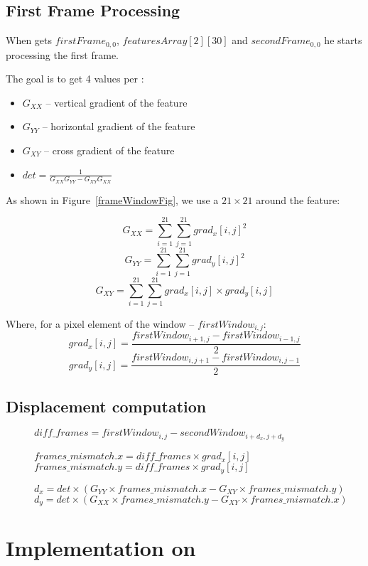 \subsection{First Frame Processing}

When \vc{} gets $firstFrame_{0,0}$,  $featuresArray[2][30]$ and $secondFrame_{0,0}$ he starts processing the first frame.

The goal is to get 4 values per :
\begin{itemize}
	\item $G_{XX}$ -- vertical gradient of the feature
	\item $G_{YY}$ -- horizontal gradient of the feature
	\item $G_{XY}$ -- cross gradient of the feature
	\item $det = \frac{1}{G_{XX}G_{YY}-G_{XY}G_{XX}}$
\end{itemize}

As shown in Figure~\ref{frameWindowFig}, we use a $21\times21$  around the feature:

$$G_{XX} = \sum_{i=1}^{21}\sum_{j=1}^{21} grad_{x}[i,j]^{2}$$
$$G_{YY} = \sum_{i=1}^{21}\sum_{j=1}^{21} grad_{y}[i,j]^{2}$$
$$G_{XY} = \sum_{i=1}^{21}\sum_{j=1}^{21} grad_{x}[i,j]\times grad_{y}[i,j]$$

Where, for a pixel element of the window -- $firstWindow_{i,j}$:
$$grad_{x}[i,j] = \frac{firstWindow_{i+1,j} - firstWindow_{i-1,j}}{2}$$
$$grad_{y}[i,j] = \frac{firstWindow_{i,j+1} - firstWindow_{i,j-1}}{2}$$


\subsection{Displacement computation}

\begin{figure}[!htbp]
\begin{algorithmic}

	\State $diff\_frames = firstWindow_{i,j} - secondWindow_{i+d_{x},j+d_{y}}$

	\State $frames\_mismatch.x = diff\_frames\times grad_{x}[i,j]$
	\State $frames\_mismatch.y = diff\_frames\times grad_{y}[i,j]$

	\State $d_{x} = det\times (G_{YY}\times frames\_mismatch.x - G_{XY}\times frames\_mismatch.y)$
	\State $d_{y} = det\times (G_{XX}\times frames\_mismatch.y - G_{XY}\times frames\_mismatch.x)$

	\EndFor
\end{algorithmic}
\end{figure}


\section{Implementation on \vc}

